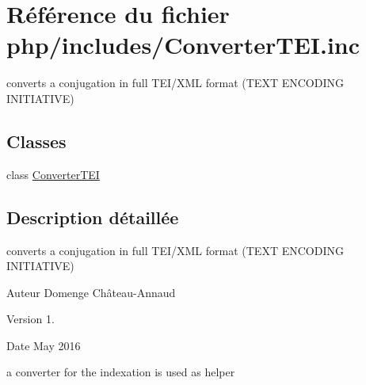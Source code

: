 \hypertarget{_converter_t_e_i_8inc}{}\section{Référence du fichier php/includes/\+Converter\+T\+EI.inc}
\label{_converter_t_e_i_8inc}


converts a conjugation in full T\+E\+I/\+X\+ML format (T\+E\+XT E\+N\+C\+O\+D\+I\+NG I\+N\+I\+T\+I\+A\+T\+I\+VE)  


\subsection*{Classes}
\begin{DoxyCompactItemize}
\item 
class \hyperlink{class_converter_t_e_i}{Converter\+T\+EI}
\end{DoxyCompactItemize}


\subsection{Description détaillée}
converts a conjugation in full T\+E\+I/\+X\+ML format (T\+E\+XT E\+N\+C\+O\+D\+I\+NG I\+N\+I\+T\+I\+A\+T\+I\+VE) 

\begin{DoxyAuthor}{Auteur}
Domenge Château-\/\+Annaud 
\end{DoxyAuthor}
\begin{DoxyVersion}{Version}
1. 
\end{DoxyVersion}
\begin{DoxyDate}{Date}
May 2016
\end{DoxyDate}
a converter for the indexation is used as helper 